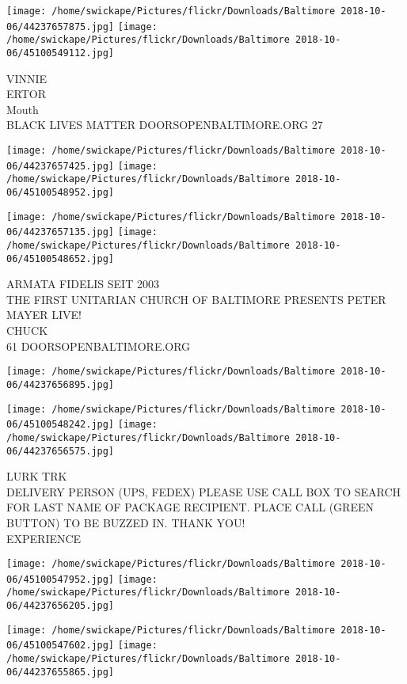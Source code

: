 \documentclass[10pt,letterpaper]{article}
\begin{document}
\texttt{[image: /home/swickape/Pictures/flickr/Downloads/Baltimore 2018-10-06/44237657875.jpg]}
\texttt{[image: /home/swickape/Pictures/flickr/Downloads/Baltimore 2018-10-06/45100549112.jpg]}

VINNIE\\
ERTOR\\
Mouth\\
BLACK LIVES MATTER DOORSOPENBALTIMORE.ORG 27
\pagebreak

\texttt{[image: /home/swickape/Pictures/flickr/Downloads/Baltimore 2018-10-06/44237657425.jpg]}
\texttt{[image: /home/swickape/Pictures/flickr/Downloads/Baltimore 2018-10-06/45100548952.jpg]}

\texttt{[image: /home/swickape/Pictures/flickr/Downloads/Baltimore 2018-10-06/44237657135.jpg]}
\texttt{[image: /home/swickape/Pictures/flickr/Downloads/Baltimore 2018-10-06/45100548652.jpg]}

ARMATA FIDELIS SEIT 2003\\
THE FIRST UNITARIAN CHURCH OF BALTIMORE PRESENTS PETER MAYER LIVE!\\
CHUCK\\
61 DOORSOPENBALTIMORE.ORG
\pagebreak

\texttt{[image: /home/swickape/Pictures/flickr/Downloads/Baltimore 2018-10-06/44237656895.jpg]}

\vspace{0.25in}
\texttt{[image: /home/swickape/Pictures/flickr/Downloads/Baltimore 2018-10-06/45100548242.jpg]}
\texttt{[image: /home/swickape/Pictures/flickr/Downloads/Baltimore 2018-10-06/44237656575.jpg]}

LURK TRK\\
DELIVERY PERSON (UPS, FEDEX) PLEASE USE CALL BOX TO SEARCH FOR LAST NAME OF PACKAGE RECIPIENT.  PLACE CALL (GREEN BUTTON) TO BE BUZZED IN.  THANK YOU!\\
EXPERIENCE
\pagebreak

\texttt{[image: /home/swickape/Pictures/flickr/Downloads/Baltimore 2018-10-06/45100547952.jpg]}
\texttt{[image: /home/swickape/Pictures/flickr/Downloads/Baltimore 2018-10-06/44237656205.jpg]}

\texttt{[image: /home/swickape/Pictures/flickr/Downloads/Baltimore 2018-10-06/45100547602.jpg]}
\texttt{[image: /home/swickape/Pictures/flickr/Downloads/Baltimore 2018-10-06/44237655865.jpg]}
\end{document}
